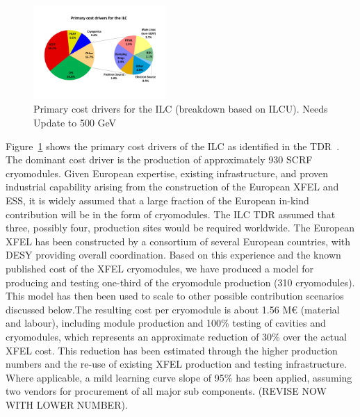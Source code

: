 \documentclass[%
 reprint,
 amsmath,amssymb,
 aps,
]{revtex4-1}
\begin{document}
\begin{figure}[htbp]
\begin{center}
\includegraphics[width=0.45\textwidth]{figures/eap-chp3-ilccostdrivers.pdf}
 \caption{\label{fig:constructionmodel:ILCPrimaryCostDrivers} Primary cost drivers for the ILC (breakdown based on ILCU). Needs Update to 500 GeV}
\end{center}
\end{figure}

Figure~\ref{fig:constructionmodel:ILCPrimaryCostDrivers} shows the primary cost drivers of the ILC as identified in the TDR~\cite{Adolphsen:2013kya}. The dominant cost driver is the production of approximately 930 SCRF cryomodules. Given European expertise, 
existing infrastructure, and proven industrial capability arising from the construction 
of the European XFEL and ESS, it is widely assumed that a large fraction of the European in-kind contribution 
will be in the form of cryomodules. The ILC TDR assumed that three, possibly four, production sites 
would be required worldwide. 
The European XFEL has been constructed by a consortium of several European countries, with DESY providing overall coordination. Based on this experience and the known published cost of the XFEL cryomodules, we have produced a model for producing and testing one-third of the cryomodule production (310 cryomodules). This model has then been used to scale to other possible contribution scenarios discussed below.The resulting cost per cryomodule is about 1.56 M\euro{} (material and labour), including module production and 100\% testing of cavities and cryomodules, which represents an approximate reduction of 30\% over the actual XFEL cost. This reduction has been estimated through the higher production numbers and the re-use of existing XFEL production and testing infrastructure.  Where applicable, a mild learning curve slope of 95\% has been applied, assuming two vendors for procurement of all major sub components. (REVISE NOW WITH LOWER NUMBER).
\end{document}
